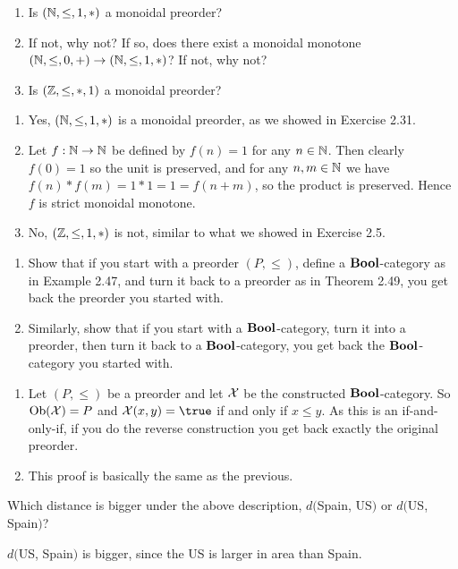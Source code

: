 \begin{enumerate}
	\item Is $(\mathbb{N}, \leq, 1, *)$ a monoidal preorder?
	\item If not, why not?  If so, does there exist a monoidal monotone $(\mathbb{N},\leq, 0, +)\to (\mathbb{N}, \leq, 1,*)$?  If not, why not?
	\item Is $(\mathbb{Z},\leq, *, 1)$ a monoidal preorder?
\end{enumerate}

\solution
\begin{enumerate}
	\item Yes, $(\mathbb{N},\leq,1,*)$ is a monoidal preorder, as we showed in Exercise 2.31.
	\item Let $f:\mathbb{N}\to\mathbb{N}$ be defined by $f(n)=1$ for any $n\in\mathbb{N}$.  Then clearly $f(0)=1$ so the unit is preserved, and for any $n,m\in\mathbb{N}$ we have $f(n)*f(m)=1*1=1=f(n+m)$, so the product is preserved.  Hence $f$ is strict monoidal monotone.
	\item No, $(\mathbb{Z},\leq,1,*)$ is not, similar to what we showed in Exercise 2.5.
\end{enumerate}

\begin{enumerate}
	\item Show that if you start with a preorder $(P,\leq)$, define a $\textbf{Bool}$-category as in Example 2.47, and turn it back to a preorder as in Theorem 2.49, you get back the preorder you started with.
	\item Similarly, show that if you start with a $\textbf{Bool}$-category, turn it into a preorder, then turn it back to a $\textbf{Bool}$-category, you get back the $\textbf{Bool}$-category you started with.
\end{enumerate}

\solution
\begin{enumerate}
	\item Let $(P,\leq)$ be a preorder and let $\mathcal{X}$ be the constructed $\textbf{Bool}$-category.  So $\textrm{Ob}(\mathcal{X})=P$ and $\mcX(x,y)=\true$ if and only if $x\leq y$.  As this is an if-and-only-if, if you do the reverse construction you get back exactly the original preorder.
	\item This proof is basically the same as the previous.
\end{enumerate}

Which distance is bigger under the above description, $d($Spain, US$)$ or $d($US, Spain$)$?

\solution
$d($US, Spain$)$ is bigger, since the US is larger in area than Spain.

